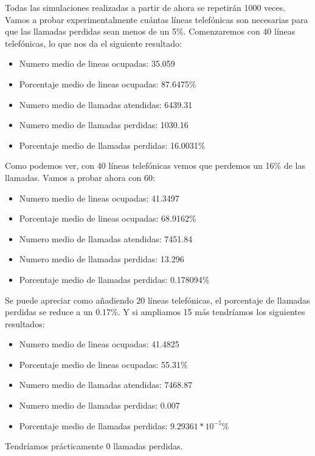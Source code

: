\documentclass[11pt,a4paper]{report}
\begin{document}
Todas las simulaciones realizadas a partir de ahora se repetirán 1000 veces. Vamos a probar experimentalmente cuántas líneas telefónicas son necesarias para que las llamadas perdidas sean menos de un 5\%. Comenzaremos con 40 líneas telefónicas, lo que nos da el siguiente resultado:

\begin{itemize}
	\item{Numero medio de lineas ocupadas: 35.059}
	\item{Porcentaje medio de lineas ocupadas: 87.6475\%}
	\item{Numero medio de llamadas atendidas: 6439.31}
	\item{Numero medio de llamadas perdidas: 1030.16}
	\item{Porcentaje medio de llamadas perdidas: 16.0031\%}
\end{itemize}

Como podemos ver, con 40 líneas telefónicas vemos que perdemos un 16\% de las llamadas. Vamos a probar ahora con 60:


\begin{itemize}
	\item{Numero medio de lineas ocupadas: 41.3497}
	\item{Porcentaje medio de lineas ocupadas: 68.9162\%}
	\item{Numero medio de llamadas atendidas: 7451.84}
	\item{Numero medio de llamadas perdidas: 13.296}
	\item{Porcentaje medio de llamadas perdidas: 0.178094\%}
\end{itemize}

Se puede apreciar como añadiendo 20 líneas telefónicas, el porcentaje de llamadas perdidas se reduce a un 0.17\%. Y si ampliamos 15 más tendríamos los siguientes resultados:

\begin{itemize}
	\item{Numero medio de lineas ocupadas: 41.4825}
	\item{Porcentaje medio de lineas ocupadas: 55.31\%}
	\item{Numero medio de llamadas atendidas: 7468.87}
	\item{Numero medio de llamadas perdidas: 0.007}
	\item{Porcentaje medio de llamadas perdidas: $9.29361 * 10^{-5}$\%}
\end{itemize}

Tendríamos prácticamente 0 llamadas perdidas.
\end{document}
